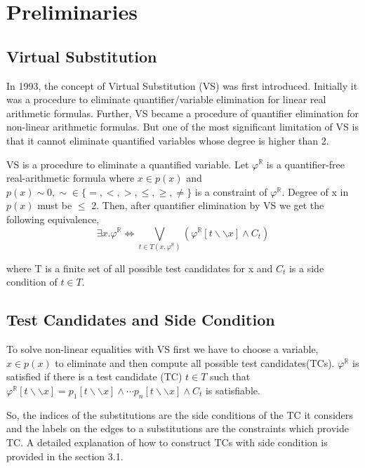 \section{Preliminaries}
\label{sec:preliminaries}
\subsection{Virtual Substitution}
In 1993, the concept of Virtual Substitution (VS) was first introduced. Initially it was a procedure to eliminate quantifier/variable elimination for linear real arithmetic formulas. Further, VS became a procedure of quantifier elimination for non-linear arithmetic formulas. But one of the most significant limitation of VS is that it cannot eliminate quantified variables whose degree is higher than 2.

VS is a procedure to eliminate a quantified variable. Let $\varphi^\mathbb{R}$ is a quantifier-free real-arithmetic formula where $x\in p(x)$ and $p(x) \sim 0, \sim \in \{=,<,>,\leq,\geq,\neq\}$ is a constraint of   $\varphi^\mathbb{R}$. Degree of x in $p(x)$ must be $\leq$ 2. Then, after quantifier elimination by VS we get the following equivalence,
$$ \exists x. \varphi^\mathbb{R} \Longleftrightarrow \bigvee\limits_{t\in T(x,\varphi^\mathbb{R})}  (\varphi^\mathbb{R} [t\backslash\backslash x] \wedge C_t)$$

where T is a finite set of all possible test candidates for x and $C_t$ is a side condition of $t \in T$.
\subsection{Test Candidates and Side Condition}
To solve non-linear equalities with VS first we have to choose a variable, $x\in p(x)$ to eliminate and then compute all possible test candidates(TCs). $\varphi^\mathbb{R}$ is satisfied if there is a test candidate (TC) $t\in T$ such that $\varphi^\mathbb{R} [t\backslash\backslash x] = p_1[t\backslash\backslash x] \wedge \cdots p_n[t\backslash\backslash x] \wedge C_t$ is satisfiable.

So, the indices of the substitutions are the side conditions of the TC it considers and the labels on the edges to a substitutions are the constraints which provide TC. A detailed explanation of how to construct TCs with side condition is provided in the section 3.1.
